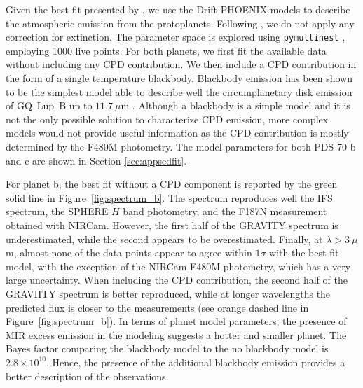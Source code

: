 \documentclass[11pt,twocolumn,twocolappendix]{aastex631}
\begin{document}
Given the best-fit presented by \cite{2021AJ....161..148W}, we use the Drift-PHOENIX models \citep{2003A&A...399..297W, 2004A&A...414..335W, 2006A&A...455..325H, 2008ApJ...675L.105H} to describe the atmospheric emission from the protoplanets. Following \cite{2021AJ....161..148W}, we do not apply any correction for extinction. The parameter space is explored using {\tt pymultinest} \citep{2014A&A...564A.125B}, employing 1000 live points. For both planets, we first fit the available data without including any CPD contribution. We then include a CPD contribution in the form of a single temperature blackbody. Blackbody emission has been shown to be the simplest model able to describe well the circumplanetary disk emission of GQ~Lup~B up to $11.7~\mu$m \citep{2024arXiv240407086C}. Although a blackbody is a simple model and it is not the only possible solution to characterize CPD emission, more complex models would not provide useful information as the CPD contribution is mostly determined by the F480M photometry. {The model parameters for both PDS 70 b and c are shown in Section \ref{sec:appsedfit}.}

For planet b, the best fit without a CPD component is reported by the green solid line in Figure~\ref{fig:spectrum_b}. The spectrum reproduces well the IFS spectrum, the SPHERE $H$ band {photometry}, and the F187N measurement obtained with NIRCam. However, the first half of the GRAVITY spectrum is underestimated, while the second appears to be overestimated. Finally, at $\lambda>3~\mu$m, almost none of the data points appear to agree within $1\sigma$ with the best-fit model, with the exception of the NIRCam F480M photometry, which has a very large uncertainty. When including the CPD contribution, the second half of the GRAVIITY spectrum is better reproduced, while at longer wavelengths the predicted flux is closer to the measurements (see orange dashed line in Figure~\ref{fig:spectrum_b}). In terms of planet model parameters, the presence of MIR excess emission in the modeling suggests a hotter and smaller planet. %
{The Bayes factor comparing the blackbody model to the no blackbody model is $2.8 \times 10^{10}$. Hence, the presence of the additional blackbody emission provides a better description of the observations. }
\end{document}
